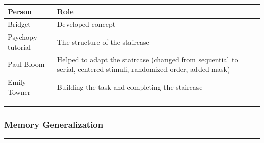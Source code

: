 \documentclass[
]{book}
\begin{document}
\begin{longtable}[]{@{}ll@{}}
\toprule
\begin{minipage}[b]{0.12\columnwidth}\raggedright
Person\strut
\end{minipage} & \begin{minipage}[b]{0.82\columnwidth}\raggedright
Role\strut
\end{minipage}\tabularnewline
\midrule
\endhead
\begin{minipage}[t]{0.12\columnwidth}\raggedright
Bridget\strut
\end{minipage} & \begin{minipage}[t]{0.82\columnwidth}\raggedright
Developed concept\strut
\end{minipage}\tabularnewline
\begin{minipage}[t]{0.12\columnwidth}\raggedright
Psychopy tutorial\strut
\end{minipage} & \begin{minipage}[t]{0.82\columnwidth}\raggedright
The structure of the staircase\strut
\end{minipage}\tabularnewline
\begin{minipage}[t]{0.12\columnwidth}\raggedright
Paul Bloom\strut
\end{minipage} & \begin{minipage}[t]{0.82\columnwidth}\raggedright
Helped to adapt the staircase (changed from sequential to serial, centered stimuli, randomized order, added mask)\strut
\end{minipage}\tabularnewline
\begin{minipage}[t]{0.12\columnwidth}\raggedright
Emily Towner\strut
\end{minipage} & \begin{minipage}[t]{0.82\columnwidth}\raggedright
Building the task and completing the staircase\strut
\end{minipage}\tabularnewline
\bottomrule
\end{longtable}

\begin{center}\rule{0.5\linewidth}{0.5pt}\end{center}

\hypertarget{memory-generalization}{%
\subsubsection{Memory Generalization}\label{memory-generalization}}

\begin{center}\rule{0.5\linewidth}{0.5pt}\end{center}
\end{document}
